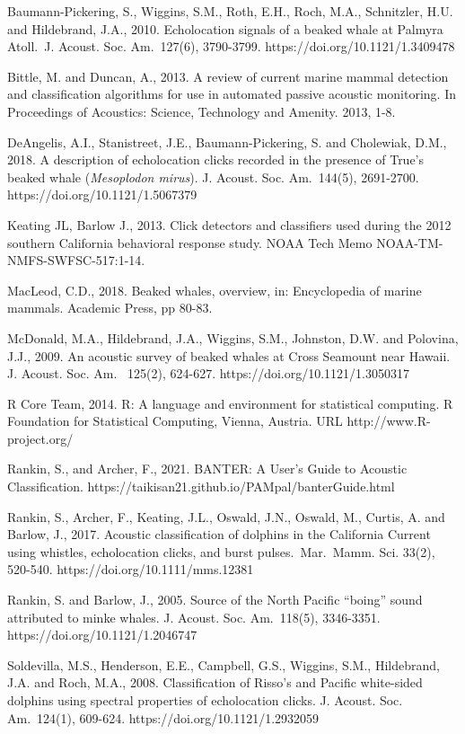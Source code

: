 \documentclass[
  authoryear,
  preprint,
  3p]{elsarticle}
\begin{document}
Baumann-Pickering, S., Wiggins, S.M., Roth, E.H., Roch, M.A.,
Schnitzler, H.U. and Hildebrand, J.A., 2010. Echolocation signals of a
beaked whale at Palmyra Atoll.~J. Acoust. Soc. Am.~127(6), 3790-3799.
https://doi.org/10.1121/1.3409478

Bittle, M. and Duncan, A., 2013. A review of current marine mammal
detection and classification algorithms for use in automated passive
acoustic monitoring. In Proceedings of Acoustics: Science, Technology
and Amenity. 2013, 1-8.

DeAngelis, A.I., Stanistreet, J.E., Baumann-Pickering, S. and Cholewiak,
D.M., 2018. A description of echolocation clicks recorded in the
presence of True's beaked whale (\emph{Mesoplodon mirus}). J. Acoust.
Soc. Am.~144(5), 2691-2700. https://doi.org/10.1121/1.5067379

Keating JL, Barlow J., 2013. Click detectors and classifiers used during
the 2012 southern California behavioral response study. NOAA Tech Memo
NOAA-TM-NMFS-SWFSC-517:1-14.

MacLeod, C.D., 2018. Beaked whales, overview, in: Encyclopedia of marine
mammals. Academic Press, pp 80-83.

McDonald, M.A., Hildebrand, J.A., Wiggins, S.M., Johnston, D.W. and
Polovina, J.J., 2009. An acoustic survey of beaked whales at Cross
Seamount near Hawaii. J. Acoust. Soc. Am.~ 125(2), 624-627.
https://doi.org/10.1121/1.3050317

R Core Team, 2014. R: A language and environment for statistical
computing. R Foundation for Statistical Computing, Vienna, Austria. URL
http://www.R-project.org/

Rankin, S., and Archer, F., 2021. BANTER: A User's Guide to Acoustic
Classification. https://taikisan21.github.io/PAMpal/banterGuide.html

Rankin, S., Archer, F., Keating, J.L., Oswald, J.N., Oswald, M., Curtis,
A. and Barlow, J., 2017. Acoustic classification of dolphins in the
California Current using whistles, echolocation clicks, and burst
pulses.~Mar.~Mamm. Sci. 33(2), 520-540.
https://doi.org/10.1111/mms.12381

Rankin, S. and Barlow, J., 2005. Source of the North Pacific ``boing''
sound attributed to minke whales. J. Acoust. Soc. Am.~118(5), 3346-3351.
https://doi.org/10.1121/1.2046747

Soldevilla, M.S., Henderson, E.E., Campbell, G.S., Wiggins, S.M.,
Hildebrand, J.A. and Roch, M.A., 2008. Classification of Risso's and
Pacific white-sided dolphins using spectral properties of echolocation
clicks. J. Acoust. Soc. Am.~124(1), 609-624.
https://doi.org/10.1121/1.2932059
\end{document}
